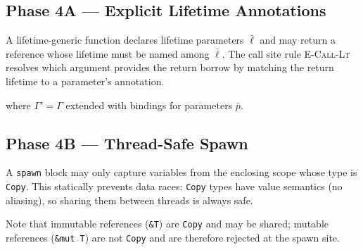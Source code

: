 \subsection*{Phase 4A --- Explicit Lifetime Annotations}

A lifetime-generic function declares lifetime parameters $\bar{\ell}$ and may
return a reference whose lifetime must be named among $\bar{\ell}$.
The call site rule \textsc{E-Call-Lt} resolves which argument provides the
return borrow by matching the return lifetime to a parameter's annotation.

\begin{prooftree}
\end{prooftree}

\noindent
where $\Gamma' = \Gamma$ extended with bindings for parameters $\bar{p}$.

\subsection*{Phase 4B --- Thread-Safe Spawn}

A \texttt{spawn} block may only capture variables from the enclosing scope
whose type is \texttt{Copy}.
This statically prevents data races: \texttt{Copy} types have value semantics
(no aliasing), so sharing them between threads is always safe.

\begin{prooftree}
\end{prooftree}

\noindent
Note that immutable references (\texttt{\&T}) are \texttt{Copy} and may be
shared; mutable references (\texttt{\&mut T}) are not \texttt{Copy} and are
therefore rejected at the spawn site.
